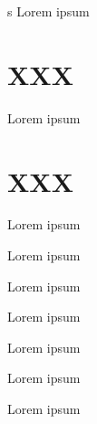 \documentclass{article}
\begin{document}
s
\newpage
Lorem ipsum

\section{XXX}

Lorem ipsum


\section{XXX}

Lorem ipsum
\begin{pages}


\begin{Rightside}

\beginnumbering
\autopar
\pstart Lorem ipsum
\pend


Lorem ipsum
\pend

Lorem ipsum
\pend
\endnumbering


\end{Rightside}
\begin{Leftside}

\beginnumbering
\autopar
\pstart Lorem ipsum
\pend


Lorem ipsum
\pend

Lorem ipsum
\pend
\endnumbering


\end{Leftside}
\end{pages}
\Pages
\end{document}
